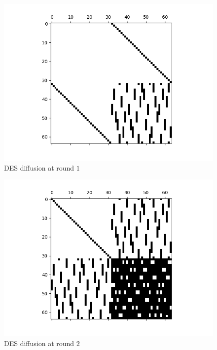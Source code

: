 \documentclass{report}
\begin{document}
\begin{figure}[H]
    \centering
    \includegraphics[scale=0.7]{sparse_des_difusao_iteracao_1.png}
    \caption{DES diffusion at round $1$}
    \label{fig:desdif1}
\end{figure}
\begin{figure}[H]
    \centering
    \includegraphics[scale=0.7]{sparse_des_difusao_iteracao_2.png}
    \caption{DES diffusion at round $2$}
    \label{fig:desdif2}
\end{figure}
\end{document}
